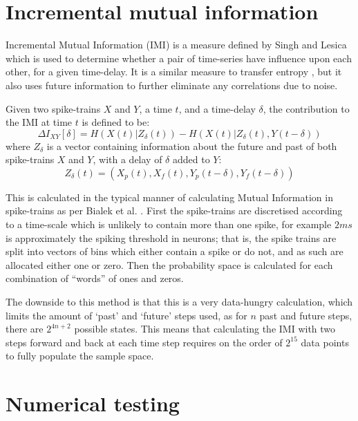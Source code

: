 \section{Incremental mutual information}
Incremental Mutual Information (IMI) is a measure defined by Singh and Lesica \cite{SinghLesica2010a} which is used to determine whether a pair of time-series have influence upon each other, for a given time-delay.  It is a similar measure to transfer entropy \cite{Schreiber2000a}, but it also uses future information to further eliminate any correlations due to noise.

Given two spike-trains $X$ and $Y$, a time $t$, and a time-delay $\delta$, the contribution to the IMI at time $t$ is defined to be:
\begin{equation}
\Delta I_{XY}[\delta] = H\left(X(t) | Z_{\delta}(t)\right) - H\left(X(t) | Z_{\delta}(t),Y(t-\delta)\right)
\end{equation}
where $Z_{\delta}$ is a vector containing information about the future and past of both spike-trains $X$ and $Y$, with a delay of $\delta$ added to $Y$:
\begin{equation}
Z_{\delta}(t) =  \left(X_p(t),X_f(t),Y_p(t-\delta), Y_f(t-\delta)\right)
\end{equation}



This is calculated in the typical manner of calculating Mutual Information in spike-trains as per Bialek et al. \cite{BialekEtAl1998a}.  First the spike-trains are discretised according to a time-scale which is unlikely to contain more than one spike, for example $2ms$ is approximately the spiking threshold in neurons; that is, the spike trains are split into vectors of bins which either contain a spike or do not, and as such are allocated either one or zero.  Then the probability space is calculated for each combination of ``words'' of ones and zeros.

The downside to this method is that this is a very data-hungry calculation, which limits the amount of `past' and `future' steps used, as for $n$ past and future steps, there are $2^{4n+2}$ possible states. This means that calculating the IMI with two steps forward and back at each time step requires on the order of $2^{15}$ data points to fully populate the sample space.

\section{Numerical testing}

